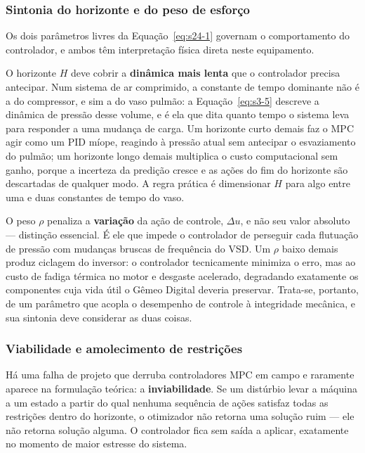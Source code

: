 \documentclass[12pt,a4paper]{article}
\numberwithin{equation}{section}
\numberwithin{table}{section}
\numberwithin{figure}{section}
\begin{document}
{	\subsubsection*{Sintonia do horizonte e do peso de esforço}

	Os dois parâmetros livres da Equação~\eqref{eq:s24-1} governam o comportamento do controlador, e ambos têm interpretação física direta neste equipamento.

	O horizonte $H$ deve cobrir a \textbf{dinâmica mais lenta} que o controlador precisa antecipar. Num sistema de ar comprimido, a constante de tempo dominante não é a do compressor, e sim a do vaso pulmão: a Equação~\eqref{eq:s3-5} descreve a dinâmica de pressão desse volume, e é ela que dita quanto tempo o sistema leva para responder a uma mudança de carga. Um horizonte curto demais faz o MPC agir como um PID míope, reagindo à pressão atual sem antecipar o esvaziamento do pulmão; um horizonte longo demais multiplica o custo computacional sem ganho, porque a incerteza da predição cresce e as ações do fim do horizonte são descartadas de qualquer modo. A regra prática é dimensionar $H$ para algo entre uma e duas constantes de tempo do vaso.

	O peso $\rho$ penaliza a \textbf{variação} da ação de controle, $\Delta u$, e não seu valor absoluto — distinção essencial. É ele que impede o controlador de perseguir cada flutuação de pressão com mudanças bruscas de frequência do VSD. Um $\rho$ baixo demais produz ciclagem do inversor: o controlador tecnicamente minimiza o erro, mas ao custo de fadiga térmica no motor e desgaste acelerado, degradando exatamente os componentes cuja vida útil o Gêmeo Digital deveria preservar. Trata-se, portanto, de um parâmetro que acopla o desempenho de controle à integridade mecânica, e sua sintonia deve considerar as duas coisas.

	\subsubsection*{Viabilidade e amolecimento de restrições}

	Há uma falha de projeto que derruba controladores MPC em campo e raramente aparece na formulação teórica: a \textbf{inviabilidade}. Se um distúrbio levar a máquina a um estado a partir do qual nenhuma sequência de ações satisfaz todas as restrições dentro do horizonte, o otimizador não retorna uma solução ruim — ele não retorna solução alguma. O controlador fica sem saída a aplicar, exatamente no momento de maior estresse do sistema.

}
\end{document}

